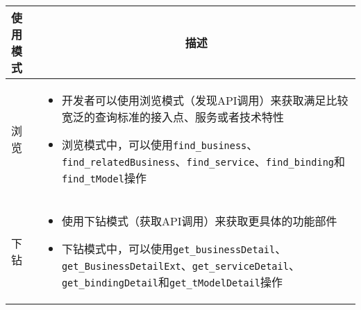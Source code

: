 \begin{longtable}{|m{2cm}<{\centering}|m{13cm}|}
    \hline
    \textbf{使用模式} & \multicolumn{1}{c|}{\textbf{描述}} \\ \hline
    浏览 &
    \vspace{-1.3em}
    \begin{itemize}[leftmargin=1.5em,itemsep=-3pt]
        \item 开发者可以使用浏览模式（发现API调用）来获取满足比较宽泛的查询标准的接入点、服务或者技术特性
        \item 浏览模式中，可以使用\;\verb|find_business|、\verb|find_relatedBusiness|、\verb|find_service|、\verb|find_binding|\;和\;\verb|find_tModel|\;操作 
    \vspace{-1.5em}
    \end{itemize}                                           
    \\ \hline
    下钻 & 
    \vspace{-1.3em}
    \begin{itemize}[leftmargin=1.5em,itemsep=-3pt]
        \item 使用下钻模式（获取API调用）来获取更具体的功能部件
        \item 下钻模式中，可以使用\;\verb|get_businessDetail|、\verb|get_BusinessDetailExt|、\verb|get_serviceDetail|、\verb|get_bindingDetail|\;和\;\verb|get_tModelDetail|\;操作
    \vspace{-1.5em}
    \end{itemize}  
    \\ \hline
\end{longtable}